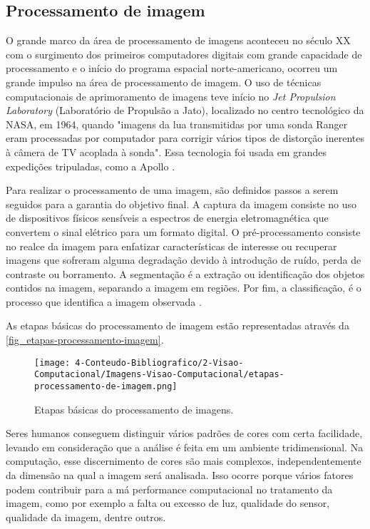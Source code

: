 \subsection{Processamento de imagem}

O grande marco da área de processamento de imagens aconteceu no século XX com o surgimento dos primeiros computadores digitais com grande capacidade de processamento e o início do programa espacial norte-americano, ocorreu um grande impulso na área de processamento de imagem. O uso de técnicas computacionais de aprimoramento de imagens teve início no \textit{Jet Propulsion Laboratory} (Laboratório de Propulsão a Jato), localizado no centro tecnológico da NASA, em 1964, quando "imagens da lua transmitidas por uma sonda Ranger eram processadas por computador para corrigir vários tipos de distorção inerentes à câmera de TV acoplada à sonda". Essa tecnologia foi usada em grandes expedições tripuladas, como a Apollo \cite{FILHO1999}.

Para realizar o processamento de uma imagem, são definidos passos a serem seguidos para a garantia do objetivo final. A captura da imagem consiste no uso de dispositivos físicos sensíveis a espectros de energia eletromagnética que convertem o sinal elétrico para um formato digital. O pré-processamento consiste no realce da imagem para enfatizar características de interesse ou recuperar imagens que sofreram alguma degradação devido à introdução de ruído, perda de contraste ou borramento. A segmentação é a extração ou identificação dos objetos contidos na imagem, separando a imagem em regiões. Por fim, a classificação, é o processo que identifica a imagem observada \cite{GONZALEZ2002}.

As etapas básicas do processamento de imagem estão representadas através da \autoref{fig_etapas-processamento-imagem}.

\begin{figure}[h]
	\caption{\label{fig_etapas-processamento-imagem}Etapas básicas do processamento de imagens.}
	\begin{center}
		\texttt{[image: 4-Conteudo-Bibliografico/2-Visao-Computacional/Imagens-Visao-Computacional/etapas-processamento-de-imagem.png]}
	\end{center}
	\centering {}
\end{figure}

Seres humanos conseguem distinguir vários padrões de cores com certa facilidade, levando em consideração que a análise é feita em um ambiente tridimensional. Na computação, esse discernimento de cores são mais complexos, independentemente da dimensão na qual a imagem será analisada. Isso ocorre porque vários fatores podem contribuir para a má performance computacional no tratamento da imagem, como por exemplo a falta ou excesso de luz, qualidade do sensor, qualidade da imagem, dentre outros.

